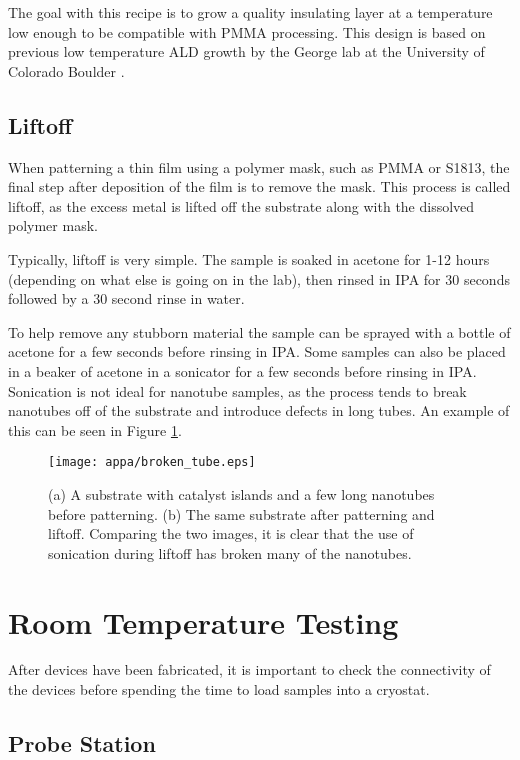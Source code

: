 The goal with this recipe is to grow a quality insulating layer at a temperature low enough to be compatible with PMMA processing. This design is based on previous low temperature ALD growth by the George lab at the University of Colorado Boulder \cite{Elam2002, Groner2004}.

\subsection{Liftoff}
\label{subsec:liftoff}

When patterning a thin film using a polymer mask, such as PMMA or S1813, the final step after deposition of the film is to remove the mask. This process is called liftoff, as the excess metal is lifted off the substrate along with the dissolved polymer mask.

Typically, liftoff is very simple. The sample is soaked in acetone for 1-12 hours (depending on what else is going on in the lab), then rinsed in IPA for 30 seconds followed by a 30 second rinse in water. 

To help remove any stubborn material the sample can be sprayed with a bottle of acetone for a few seconds before rinsing in IPA. Some samples can also be placed in a beaker of acetone in a sonicator for a few seconds before rinsing in IPA. Sonication is not ideal for nanotube samples, as the process tends to break nanotubes off of the substrate and introduce defects in long tubes. An example of this can be seen in Figure \ref{fig:broken_tube}.

\begin{figure}
	\centering
	\texttt{[image: appa/broken\_tube.eps]}
	\caption{(a) A substrate with catalyst islands and a few long nanotubes before patterning. (b) The same substrate after patterning and liftoff. Comparing the two images, it is clear that the use of sonication during liftoff has broken many of the nanotubes.}
	\label{fig:broken_tube}
\end{figure}

\section{Room Temperature Testing}

After devices have been fabricated, it is important to check the connectivity of the devices before spending the time to load samples into a cryostat.

\subsection{Probe Station}
\label{subsec:probe_station}


